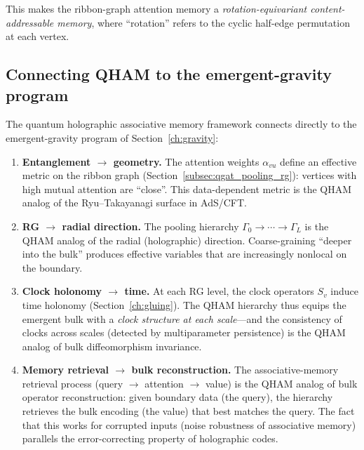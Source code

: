 \documentclass[11pt,oneside]{amsbook}
\numberwithin{equation}{section}
\theoremstyle{plain}
\theoremstyle{definition}
\theoremstyle{remark}
\begin{document}
This makes the ribbon-graph attention memory a \emph{rotation-equivariant content-addressable
memory}, where ``rotation'' refers to the cyclic half-edge permutation at each vertex.

\subsection{Connecting QHAM to the emergent-gravity program}
\label{subsec:qham_gravity}

The quantum holographic associative memory framework connects directly to the
emergent-gravity program of Section~\ref{ch:gravity}:

\begin{enumerate}
\item \textbf{Entanglement $\to$ geometry.}
The attention weights $\alpha_{vu}$ define an effective metric on the ribbon graph
(Section~\ref{subsec:qgat_pooling_rg}): vertices with high mutual attention are ``close''.
This data-dependent metric is the QHAM analog of the Ryu--Takayanagi surface in AdS/CFT.

\item \textbf{RG $\to$ radial direction.}
The pooling hierarchy $\Gamma_0\to\cdots\to\Gamma_L$ is the QHAM analog of the radial
(holographic) direction.  Coarse-graining ``deeper into the bulk'' produces effective
variables that are increasingly nonlocal on the boundary.

\item \textbf{Clock holonomy $\to$ time.}
At each RG level, the clock operators $S_v$ induce time holonomy
(Section~\ref{ch:gluing}).  The QHAM hierarchy thus equips the emergent bulk with a
\emph{clock structure at each scale}---and the consistency of clocks across scales
(detected by multiparameter persistence) is the QHAM analog of bulk diffeomorphism
invariance.

\item \textbf{Memory retrieval $\to$ bulk reconstruction.}
The associative-memory retrieval process (query $\to$ attention $\to$ value) is the QHAM
analog of bulk operator reconstruction: given boundary data (the query), the hierarchy
retrieves the bulk encoding (the value) that best matches the query.
The fact that this works for corrupted inputs (noise robustness of associative memory)
parallels the error-correcting property of holographic codes.
\end{enumerate}
\end{document}
